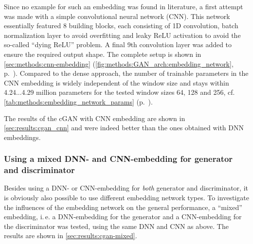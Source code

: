 Since no example for such an embedding was found in literature, a first attempt was made with a simple convolutional neural network (CNN).
This network essentially featured 8 building blocks, each consisting of 1D convolution, batch normalization layer to avoid overfitting and leaky ReLU activation \cite{Maas2013}
to avoid the so-called ``dying ReLU'' problem. 
A final 9th convolution layer was added to ensure the required output shape. 
The complete setup is shown in \cref{sec:methods:cnn-embedding} (\cref{fig:methods:GAN_arch:embedding_network}, p.~\pageref{fig:methods:GAN_arch:embedding_network}).
Compared to the dense approach, the number of trainable parameters in the CNN embedding is widely independent of the window size and 
stays within 4.24...4.29 million parameters for the tested window sizes 64, 128 and 256, cf. \cref{tab:methods:embedding_network_params} (p.~\pageref{tab:methods:embedding_network_params}).

The results of the cGAN with CNN embedding are shown in \cref{sec:results:cgan_cnn} and were indeed better than the ones obtained with DNN embeddings.

\subsubsection{Using a mixed DNN- and CNN-embedding for generator and discriminator}
Besides using a DNN- or CNN-embedding for \emph{both} generator and discriminator, it is obviously also possible
to use different embedding network types.
To investigate the influences of the embedding network on the general performance,
a ``mixed'' embedding, i.\,e. a DNN-embedding for the generator and a CNN-embedding for the discriminator was tested,
using the same DNN and CNN as above.
The results are shown in \ref{sec:results:cgan-mixed}.











